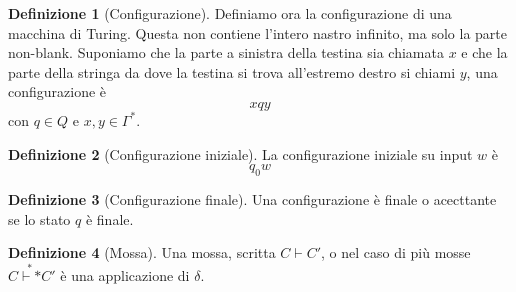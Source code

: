 \documentclass[12pt]{report}
\theoremstyle{definition}
\newtheorem{definizione}{Definizione}
\begin{document}
\begin{definizione}[Configurazione]
Definiamo ora la configurazione di una macchina di Turing.
Questa non contiene l'intero nastro infinito, ma solo la parte non-blank.
Suponiamo che la parte a sinistra della testina sia chiamata $x$ e che la parte della stringa da dove la testina si trova all'estremo destro si chiami $y$, una configurazione è
$$ xqy $$
con $q \in Q$ e $x, y \in \Gamma^*$.
\end{definizione}

\begin{definizione}[Configurazione iniziale]
	La configurazione iniziale su input $w$ è
	$$ q_0w $$
\end{definizione}
\begin{definizione}[Configurazione finale]
	Una configurazione è finale o acecttante se lo stato $q$ è finale.
\end{definizione}

\begin{definizione}[Mossa]
	Una mossa, scritta $C \vdash C'$, o nel caso di più mosse $C \overset{*}{\vdash*} C'$ è una applicazione di $\delta$.
\end{definizione}
\end{document}
